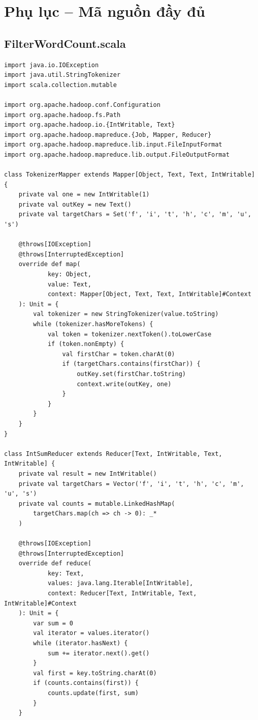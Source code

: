 \section{Phụ lục -- Mã nguồn đầy đủ}
\label{sec:appendix}

\subsection{FilterWordCount.scala}

\begin{lstlisting}[style=scalastyle, caption={Mã nguồn đầy đủ FilterWordCount.scala}]
import java.io.IOException
import java.util.StringTokenizer
import scala.collection.mutable

import org.apache.hadoop.conf.Configuration
import org.apache.hadoop.fs.Path
import org.apache.hadoop.io.{IntWritable, Text}
import org.apache.hadoop.mapreduce.{Job, Mapper, Reducer}
import org.apache.hadoop.mapreduce.lib.input.FileInputFormat
import org.apache.hadoop.mapreduce.lib.output.FileOutputFormat

class TokenizerMapper extends Mapper[Object, Text, Text, IntWritable] {
    private val one = new IntWritable(1)
    private val outKey = new Text()
    private val targetChars = Set('f', 'i', 't', 'h', 'c', 'm', 'u', 's')

    @throws[IOException]
    @throws[InterruptedException]
    override def map(
            key: Object,
            value: Text,
            context: Mapper[Object, Text, Text, IntWritable]#Context
    ): Unit = {
        val tokenizer = new StringTokenizer(value.toString)
        while (tokenizer.hasMoreTokens) {
            val token = tokenizer.nextToken().toLowerCase
            if (token.nonEmpty) {
                val firstChar = token.charAt(0)
                if (targetChars.contains(firstChar)) {
                    outKey.set(firstChar.toString)
                    context.write(outKey, one)
                }
            }
        }
    }
}

class IntSumReducer extends Reducer[Text, IntWritable, Text, IntWritable] {
    private val result = new IntWritable()
    private val targetChars = Vector('f', 'i', 't', 'h', 'c', 'm', 'u', 's')
    private val counts = mutable.LinkedHashMap(
        targetChars.map(ch => ch -> 0): _*
    )

    @throws[IOException]
    @throws[InterruptedException]
    override def reduce(
            key: Text,
            values: java.lang.Iterable[IntWritable],
            context: Reducer[Text, IntWritable, Text, IntWritable]#Context
    ): Unit = {
        var sum = 0
        val iterator = values.iterator()
        while (iterator.hasNext) {
            sum += iterator.next().get()
        }
        val first = key.toString.charAt(0)
        if (counts.contains(first)) {
            counts.update(first, sum)
        }
    }


\end{lstlisting}
